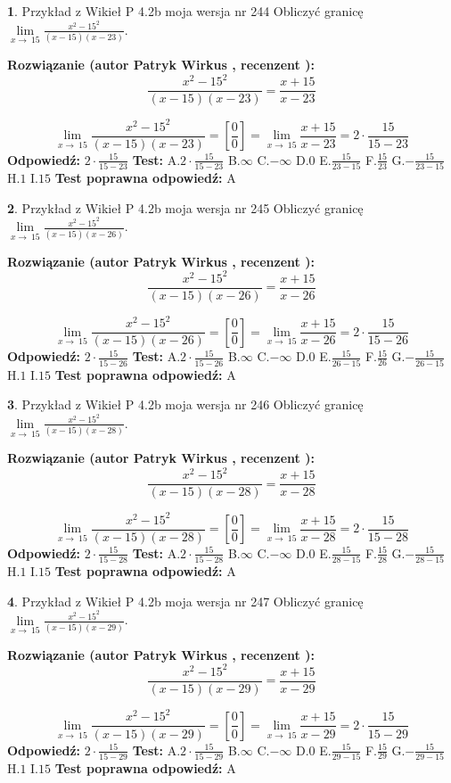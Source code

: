 \documentclass[12pt, a4paper]{article}
\theoremstyle{definition} %
\newtheorem{zad}{}
\newcommand{\zadStart}[1]{\begin{zad}#1\newline}
\newcommand{\zadStop}{\end{zad}}
\newcommand{\rozwStart}[2]{\noindent \textbf{Rozwiązanie (autor #1 , recenzent #2): }\newline}
\newcommand{\rozwStop}{\newline}
\newcommand{\odpStart}{\noindent \textbf{Odpowiedź:}\newline}
\newcommand{\odpStop}{\newline}
\newcommand{\testStart}{\noindent \textbf{Test:}\newline}
\newcommand{\testStop}{\newline}
\newcommand{\kluczStart}{\noindent \textbf{Test poprawna odpowiedź:}\newline}
\newcommand{\kluczStop}{\newline}
\begin{document}
\zadStart{Przykład z Wikieł P 4.2b moja wersja nr 244}
Obliczyć granicę $\lim\limits_{x\to\ 15}\frac{x^{2}-15^{2}}{(x-15)(x-23)}$.
\zadStop
\rozwStart{Patryk Wirkus}{}
$$\frac{x^{2}-15^{2}}{(x-15)(x-23)}=\frac{x+15}{x-23}$$

$$\lim\limits_{x\to\ 15}\frac{x^{2}-15^{2}}{(x-15)(x-23)}=[\frac{0}{0}]=\lim\limits_{x\to\ 15}\frac{x+15}{x-23}=2 \cdot \frac{15}{15-23}$$
\rozwStop
\odpStart
$2 \cdot \frac{15}{15-23}$
\odpStop
\testStart
A.$2 \cdot \frac{15}{15-23}$
B.$\infty$
C.$-\infty$
D.$0$
E.$\frac{15}{23-15}$
F.$\frac{15}{23}$
G.$-\frac{15}{23-15}$
H.$1$
I.$15$
\testStop
\kluczStart
A
\kluczStop



\zadStart{Przykład z Wikieł P 4.2b moja wersja nr 245}
Obliczyć granicę $\lim\limits_{x\to\ 15}\frac{x^{2}-15^{2}}{(x-15)(x-26)}$.
\zadStop
\rozwStart{Patryk Wirkus}{}
$$\frac{x^{2}-15^{2}}{(x-15)(x-26)}=\frac{x+15}{x-26}$$

$$\lim\limits_{x\to\ 15}\frac{x^{2}-15^{2}}{(x-15)(x-26)}=[\frac{0}{0}]=\lim\limits_{x\to\ 15}\frac{x+15}{x-26}=2 \cdot \frac{15}{15-26}$$
\rozwStop
\odpStart
$2 \cdot \frac{15}{15-26}$
\odpStop
\testStart
A.$2 \cdot \frac{15}{15-26}$
B.$\infty$
C.$-\infty$
D.$0$
E.$\frac{15}{26-15}$
F.$\frac{15}{26}$
G.$-\frac{15}{26-15}$
H.$1$
I.$15$
\testStop
\kluczStart
A
\kluczStop



\zadStart{Przykład z Wikieł P 4.2b moja wersja nr 246}
Obliczyć granicę $\lim\limits_{x\to\ 15}\frac{x^{2}-15^{2}}{(x-15)(x-28)}$.
\zadStop
\rozwStart{Patryk Wirkus}{}
$$\frac{x^{2}-15^{2}}{(x-15)(x-28)}=\frac{x+15}{x-28}$$

$$\lim\limits_{x\to\ 15}\frac{x^{2}-15^{2}}{(x-15)(x-28)}=[\frac{0}{0}]=\lim\limits_{x\to\ 15}\frac{x+15}{x-28}=2 \cdot \frac{15}{15-28}$$
\rozwStop
\odpStart
$2 \cdot \frac{15}{15-28}$
\odpStop
\testStart
A.$2 \cdot \frac{15}{15-28}$
B.$\infty$
C.$-\infty$
D.$0$
E.$\frac{15}{28-15}$
F.$\frac{15}{28}$
G.$-\frac{15}{28-15}$
H.$1$
I.$15$
\testStop
\kluczStart
A
\kluczStop



\zadStart{Przykład z Wikieł P 4.2b moja wersja nr 247}
Obliczyć granicę $\lim\limits_{x\to\ 15}\frac{x^{2}-15^{2}}{(x-15)(x-29)}$.
\zadStop
\rozwStart{Patryk Wirkus}{}
$$\frac{x^{2}-15^{2}}{(x-15)(x-29)}=\frac{x+15}{x-29}$$

$$\lim\limits_{x\to\ 15}\frac{x^{2}-15^{2}}{(x-15)(x-29)}=[\frac{0}{0}]=\lim\limits_{x\to\ 15}\frac{x+15}{x-29}=2 \cdot \frac{15}{15-29}$$
\rozwStop
\odpStart
$2 \cdot \frac{15}{15-29}$
\odpStop
\testStart
A.$2 \cdot \frac{15}{15-29}$
B.$\infty$
C.$-\infty$
D.$0$
E.$\frac{15}{29-15}$
F.$\frac{15}{29}$
G.$-\frac{15}{29-15}$
H.$1$
I.$15$
\testStop
\kluczStart
A
\kluczStop
\end{document}
